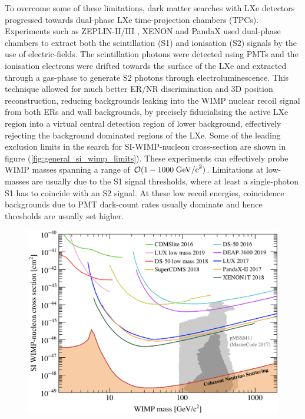 {To overcome some of these limitations, dark matter searches with LXe detectors progressed towards dual-phase LXe time-projection chambers (TPCs). Experiments such as ZEPLIN-II/III \cite{zeplin2, zeplin3}, XENON \cite{xenon100} and PandaX \cite{pandax} used dual-phase chambers to extract both the scintillation (S1) and ionisation (S2) signals by the use of electric-fields. The scintillation photons were detected using PMTs and the ionisation electrons were drifted towards the surface of the LXe and extracted through a gas-phase to generate S2 photons through electroluminescence. This technique allowed for much better ER/NR discrimination and 3D position reconstruction, reducing backgrounds leaking into the WIMP nuclear recoil signal from both ERs and wall backgrounds, by precisely fiducialising the active LXe region into a virtual central detection region of lower background, effectively rejecting the background dominated regions of the LXe. Some of the leading exclusion limits in the search for SI-WIMP-nucleon cross-section are shown in figure (\ref{fig:general_si_wimp_limits}). These experiments can effectively probe WIMP masses spanning a range of $\mathcal{O}(1-1000 \; \text{GeV/c}^2)$. Limitations at low-masses are usually due to the S1 signal thresholds, where at least a single-photon S1 has to coincide with an S2 signal. At these low recoil energies, coincidence backgrounds due to PMT dark-count rates usually dominate and hence thresholds are usually set higher. 
%
\begin{figure}[ht!]
    \begin{center}
        \includegraphics[scale=0.40]{Chapter_1/Figures/General_SI-WIMP_limits.png}

\end{center}
\end{figure}}

